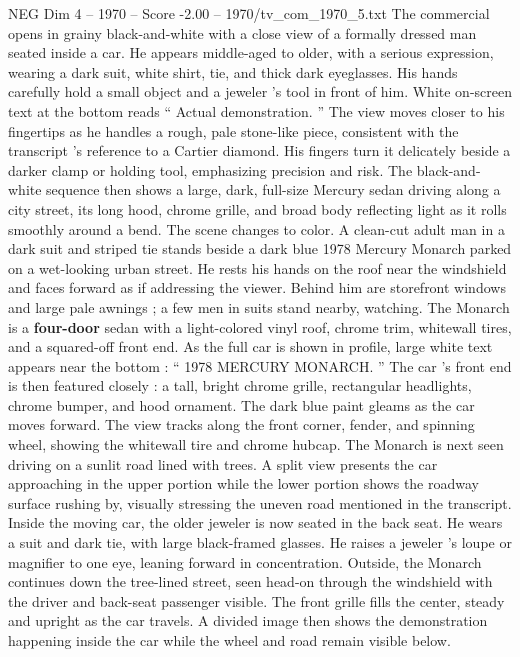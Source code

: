 \begin{textsample}{NEG Dim 4 – 1970 – Score -2.00 – 1970/tv\_com\_1970\_5.txt}  \label{ex:f4_neg_002}
The commercial opens in grainy black-and-white with a close view of a formally dressed man seated inside a car.
He appears middle-aged to older, with a serious expression, wearing a dark suit, white shirt, tie, and thick dark eyeglasses.
His hands carefully hold a small object and a jeweler ’s tool in front of him.
White on-screen text at the bottom reads “ Actual demonstration. ” The view moves closer to his fingertips as he handles a rough, pale stone-like piece, consistent with the transcript ’s reference to a Cartier diamond.
His fingers turn it delicately beside a darker clamp or holding tool, emphasizing precision and risk.
The black-and-white sequence then shows a large, dark, full-size Mercury sedan driving along a city street, its long hood, chrome grille, and broad body reflecting light as it rolls smoothly around a bend.
The scene changes to color.
A clean-cut adult man in a dark suit and striped tie stands beside a dark blue 1978 Mercury Monarch parked on a wet-looking urban street.
He rests his hands on the roof near the windshield and faces forward as if addressing the viewer.
Behind him are storefront windows and large pale awnings ; a few men in suits stand nearby, watching.
The Monarch is a \textbf{four-door} sedan with a light-colored vinyl roof, chrome trim, whitewall tires, and a squared-off front end.
As the full car is shown in profile, large white text appears near the bottom : “ 1978 MERCURY MONARCH. ” The car ’s front end is then featured closely : a tall, bright chrome grille, rectangular headlights, chrome bumper, and hood ornament.
The dark blue paint gleams as the car moves forward.
The view tracks along the front corner, fender, and spinning wheel, showing the whitewall tire and chrome hubcap.
The Monarch is next seen driving on a sunlit road lined with trees.
A split view presents the car approaching in the upper portion while the lower portion shows the roadway surface rushing by, visually stressing the uneven road mentioned in the transcript.
Inside the moving car, the older jeweler is now seated in the back seat.
He wears a suit and dark tie, with large black-framed glasses.
He raises a jeweler ’s loupe or magnifier to one eye, leaning forward in concentration.
Outside, the Monarch continues down the tree-lined street, seen head-on through the windshield with the driver and back-seat passenger visible.
The front grille fills the center, steady and upright as the car travels.
A divided image then shows the demonstration happening inside the car while the wheel and road remain visible below.

\end{textsample}

